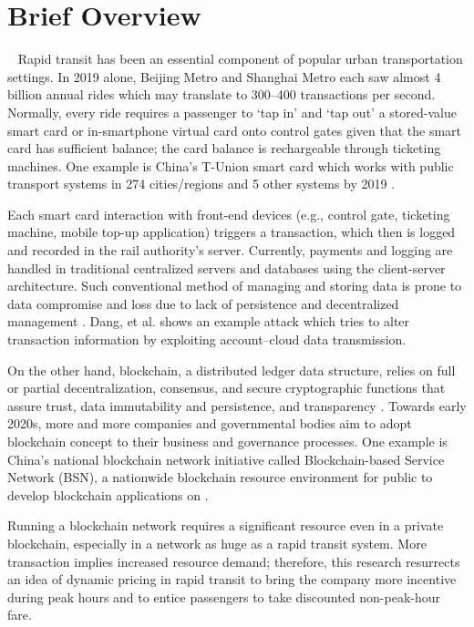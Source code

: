 \documentclass[a4paper,12pt,oneside, utf8x]{report}
\begin{document}
\section{Brief Overview}\
\label{sbriefov}
   Rapid transit has been an essential component of popular urban transportation settings. In 2019 alone, Beijing Metro and Shanghai Metro each saw almost 4 billion annual rides \cite{a1} which may translate to 300–400 transactions per second. Normally, every ride requires a passenger to ‘tap in’ and ‘tap out’ a stored-value smart card or in-smartphone virtual card onto control gates given that the smart card has sufficient balance; the card balance is rechargeable through ticketing machines. One example is China’s T-Union smart card which works with public transport systems in 274 cities/regions and 5 other systems by 2019 \cite{a2}.
   
Each smart card interaction with front-end devices (e.g., control gate, ticketing machine, mobile top-up application) triggers a transaction, which then is logged and recorded in the rail authority’s server. Currently, payments and logging are handled in traditional centralized servers and databases \cite{a3,a4} using the client-server architecture. Such conventional method of managing and storing data is prone to data compromise and loss due to lack of persistence and decentralized management \cite{a5}. Dang, et al. \cite{a6} shows an example attack which tries to alter transaction information by exploiting account–cloud data transmission.

On the other hand, blockchain, a distributed ledger data structure, relies on full or partial decentralization, consensus, and secure cryptographic functions that assure trust, data immutability and persistence, and transparency \cite{a7}. Towards early 2020s, more and more companies and governmental bodies aim to adopt blockchain concept to their business and governance processes. One example is China’s national blockchain network initiative called Blockchain-based Service Network (BSN), a nationwide blockchain resource environment for public to develop blockchain applications on \cite{a8}.

Running a blockchain network requires a significant resource even in a private blockchain, especially in a network as huge as a rapid transit system. More transaction implies increased resource demand; therefore, this research resurrects an idea of dynamic pricing in rapid transit to bring the company more incentive during peak hours and to entice passengers to take discounted non-peak-hour fare.
\end{document}
